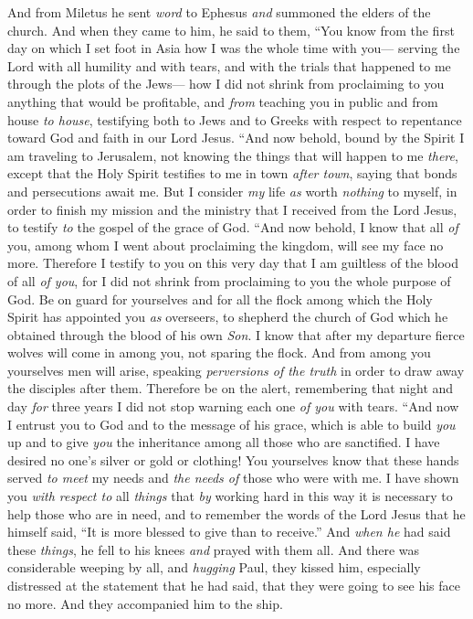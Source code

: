 \begin{biblechapter}
 And from Miletus he sent \textit{word} to Ephesus \textit{and} summoned the elders of the church.
\verse And when they came to him, he said to them, “You know from the first day on which I set foot in Asia how I was the whole time with you—
\verse serving the Lord with all humility and with tears, and with the trials that happened to me through the plots of the Jews—
\verse how I did not shrink from proclaiming to you anything that would be profitable, and \textit{from} teaching you in public and from house \textit{to house},
\verse testifying both to Jews and to Greeks with respect to repentance toward God and faith in our Lord Jesus.
\verse “And now behold, bound by the Spirit I am traveling to Jerusalem, not knowing the things that will happen to me \textit{there},
\verse except that the Holy Spirit testifies to me in town \textit{after town}, saying that bonds and persecutions await me.
\verse But I consider \textit{my} life \textit{as} worth \textit{nothing} to myself, in order to finish my mission and the ministry that I received from the Lord Jesus, to testify \textit{to} the gospel of the grace of God.
\verse “And now behold, I know that all \textit{of} you, among whom I went about proclaiming the kingdom, will see my face no more.
\verse Therefore I testify to you on this very day that I am guiltless of the blood of all \textit{of you},
\verse for I did not shrink from proclaiming to you the whole purpose of God.
\verse Be on guard for yourselves and for all the flock among which the Holy Spirit has appointed you \textit{as} overseers, to shepherd the church of God which he obtained through the blood of his own \textit{Son}.
\verse I know that after my departure fierce wolves will come in among you, not sparing the flock.
\verse And from among you yourselves men will arise, speaking \textit{perversions of the truth} in order to draw away the disciples after them.
\verse Therefore be on the alert, remembering that night and day \textit{for} three years I did not stop warning each one \textit{of you} with tears.
\verse “And now I entrust you to God and to the message of his grace, which is able to build \textit{you} up and to give \textit{you} the inheritance among all those who are sanctified.
\verse I have desired no one’s silver or gold or clothing!
\verse You yourselves know that these hands served \textit{to meet} my needs and \textit{the needs of} those who were with me.
\verse I have shown you \textit{with respect to} all \textit{things} that \textit{by} working hard in this way it is necessary to help those who are in need, and to remember the words of the Lord Jesus that he himself said, “It is more blessed to give than to receive.”
\verse And \textit{when he} had said these \textit{things}, he fell to his knees \textit{and} prayed with them all.
\verse And there was considerable weeping by all, and \textit{hugging} Paul, they kissed him,
\verse especially distressed at the statement that he had said, that they were going to see his face no more. And they accompanied him to the ship.
\end{biblechapter}

